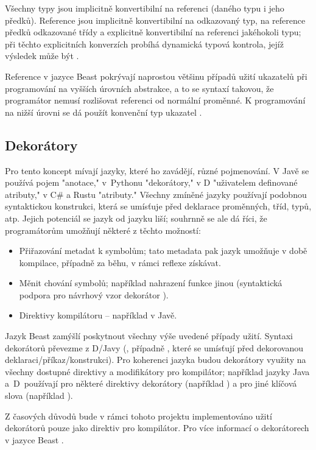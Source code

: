 Všechny typy jsou implicitně konvertibilní na referenci (daného typu i jeho předků). Reference jsou implicitně konvertibilní na odkazovaný typ, na reference předků odkazované třídy a explicitně konvertibilní na referenci jakéhokoli typu; při těchto explicitních konverzích probíhá dynamická typová kontrola, jejíž výsledek může být .

Reference v jazyce Beast pokrývají naprostou většinu případů užití ukazatelů při programování na vyšších úrovních abstrakce, a to se syntaxí takovou, že programátor nemusí rozlišovat referenci od normální proměnné. K programování na nižší úrovni se dá použít konvenční typ ukazatel .

\subsection{Dekorátory} \label{decorators}
Pro tento koncept mívají jazyky, které ho zavádějí, různé pojmenování. V Javě se používá pojem "anotace," v~Pythonu "dekorátory," v D "uživatelem definované atributy," v C\# a Rustu "atributy." Všechny zmíněné jazyky používají podobnou syntaktickou konstrukci, která se umísťuje před deklarace proměnných, tříd, typů, atp. Jejich potenciál se jazyk od jazyku liší; souhrnně se ale dá říci, že programátorům umožňují některé z těchto možností:
\begin{itemize}
	\item Přiřazování metadat k symbolům; tato metadata pak jazyk umožňuje v době kompilace, případně za běhu, v rámci reflexe získávat.
	\item Měnit chování symbolů; například nahrazení funkce jinou (syntaktická podpora pro návrhový vzor dekorátor \cite{Wiki_Decorator}).
	\item Direktivy kompilátoru -- například  v Javě.
\end{itemize}

Jazyk Beast zamýšlí poskytnout všechny výše uvedené případy užití. Syntaxi dekorátorů převezme z D/Javy (, případně , které se umísťují před dekorovanou deklaraci/příkaz/konstrukci). Pro koherenci jazyka budou dekorátory využity na všechny dostupné direktivy a modifikátory pro kompilátor; například jazyky Java a~D~používají pro některé direktivy dekorátory (například ) a pro jiné klíčová slova (například ).

Z časových důvodů bude v rámci tohoto projektu implementováno užití dekorátorů pouze jako direktiv pro kompilátor. Pro více informací o dekorátorech v jazyce Beast .

